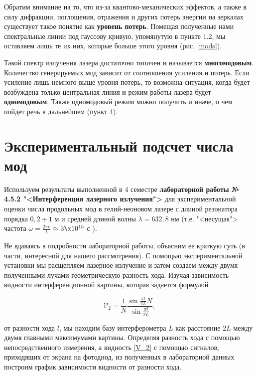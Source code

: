 \documentclass[12pt]{kiarticle}
\begin{document}
Обратим внимание на то, что из-за квантово-механических эффектов, а также в силу дифракции, поглощения, отражения и других потерь энергии на зеркалах существует такое понятие как \textbf{уровень потерь}. Помещая полученные нами спектральные линии под гауссову кривую, упомянутую в пункте 1.2, мы оставляем лишь те их них, которые больше этого уровня (рис. \ref{mods}).


Такой спектр излучения лазера достаточно типичен и называется \textbf{многомодовым}. Количество генерируемых мод
зависит от соотношения усиления и потерь. Если усиление лишь немного выше уровня потерь, то возможна ситуация, когда будет возбуждена
только центральная линия и режим работы лазера будет \textbf{одномодовым}. Также одномодовый режим можно получить и иначе, о чем пойдет речь в дальнейшем (пункт 4).

\section{Экспериментальный подсчет числа мод}

Используем результаты выполненной в 4 семестре \textbf{лабораторной работы № 4.5.2 "<Интерференция лазерного излучения">} для экспериментальной оценки числа продольных мод в гелий-неоновом лазере с длиной резонатора порядка $ 0,2 \div 1 $ м и средней длиной волны $ \lambda = 632,8 $ нм (т.е. "<несущая"> частота $ \omega = \frac{2\pi c}{\lambda} $
$\approx 3 \x 10^{15} $ с ). 

Не вдаваясь в подробности лабораторной работы, объясним ее краткую суть (в части, интересной для нашего рассмотрения). С помощью экспериментальной установки мы расщепляем лазерное излучение и затем создаем между двумя полученными лучами геометрическую разность хода. Изучая зависимость видности интерференционной картины, которая задается формулой

\begin{equation}\label{V_2}
\mathcal{V}_2 = \dfrac{1}{N} \dfrac{\sin {\frac{\pi l}{2L}N}}{\sin {\frac{\pi l}{2L}}},
\end{equation}

от разности хода $ l $, мы находим базу интерферометра $ L $ как расстояние $ 2L $ между двумя главными максимумами картины. Определяя разность хода с помощью непосредственного измерения, а видность \eqref{V_2} с помощью сигналов, приходящих от экрана на фотодиод, из полученных в лабораторной данных построим график зависимости видности от разности хода.
\end{document}
